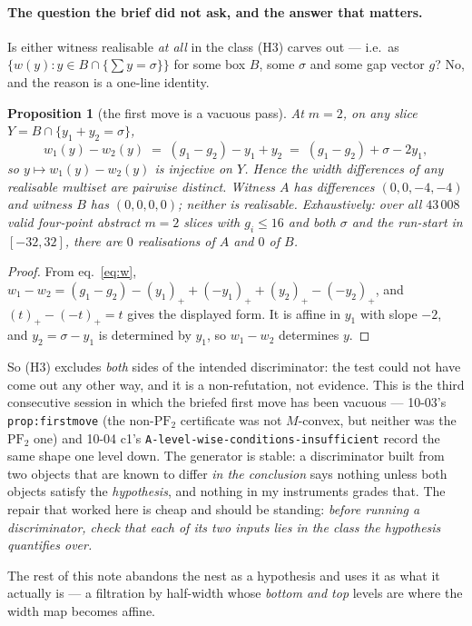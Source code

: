 \documentclass[11pt]{article}
\theoremstyle{plain}
\newtheorem{proposition}[theorem]{Proposition}
\theoremstyle{definition}
\newcommand{\PFtwo}{\mathrm{PF}_2}
\newcommand{\pp}[1]{\left(#1\right)_{+}}
\begin{document}
\paragraph{The question the brief did not ask, and the answer that matters.}
Is either witness realisable \emph{at all} in the class (H3) carves out --- i.e.\ as
$\{w(y):y\in B\cap\{\sum y=\sigma\}\}$ for some box $B$, some $\sigma$ and some gap
vector $g$? No, and the reason is a one-line identity.

\begin{proposition}[the first move is a vacuous pass]\label{prop:vacuous}
At $m=2$, on any slice $Y=B\cap\{y_1+y_2=\sigma\}$,
\[
   w_1(y)-w_2(y)\;=\;(g_1-g_2)-y_1+y_2\;=\;(g_1-g_2)+\sigma-2y_1 ,
\]
so $y\mapsto w_1(y)-w_2(y)$ is injective on $Y$. Hence the width differences of any
realisable multiset are \emph{pairwise distinct}. Witness $A$ has differences
$(0,0,-4,-4)$ and witness $B$ has $(0,0,0,0)$; neither is realisable. Exhaustively:
over all $43\,008$ valid four-point abstract $m=2$ slices with $g_i\le16$ and both
$\sigma$ and the run-start in $[-32,32]$, there are $0$ realisations of $A$ and $0$ of $B$.
\end{proposition}

\begin{proof}
From eq.~\eqref{eq:w}, $w_1-w_2=(g_1-g_2)-\pp{y_1}+\pp{-y_1}+\pp{y_2}-\pp{-y_2}$, and
$\pp{t}-\pp{-t}=t$ gives the displayed form. It is affine in $y_1$ with slope $-2$, and
$y_2=\sigma-y_1$ is determined by $y_1$, so $w_1-w_2$ determines $y$.
\end{proof}

So (H3) excludes \emph{both} sides of the intended discriminator: the test could not have
come out any other way, and it is a non-refutation, not evidence. This is the third
consecutive session in which the briefed first move has been vacuous --- 10-03's
\texttt{prop:firstmove} (the non-$\PFtwo$ certificate was not $M$-convex, but neither was
the $\PFtwo$ one) and 10-04 c1's \texttt{A-level-wise-conditions-insufficient} record the
same shape one level down. The generator is stable: a discriminator built from two objects
that are known to differ \emph{in the conclusion} says nothing unless both objects satisfy
the \emph{hypothesis}, and nothing in my instruments grades that. The repair that worked
here is cheap and should be standing: \emph{before running a discriminator, check that each
of its two inputs lies in the class the hypothesis quantifies over.}

The rest of this note abandons the nest as a hypothesis and uses it as what it actually
is --- a filtration by half-width whose \emph{bottom and top} levels are where the width
map becomes affine.
\end{document}
